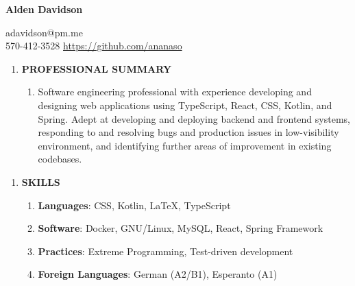 \documentclass[11pt]{article}
\begin{document}
\begin{center}
\begin{minipage}{0.70\textwidth}
	{\Huge\textbf{Alden Davidson}}
\end{minipage}%
\begin{minipage}{0.30\textwidth}
	\raggedleft
	adavidson@pm.me\\
    570-412-3528
    \url{https://github.com/ananaso}
\end{minipage}
\end{center}
\begin{center}
\begin{enumerate}[label={}, leftmargin=0pt, parsep=5pt]
    \item {\Large \textbf{PROFESSIONAL SUMMARY}}
    \begin{enumerate}[label={}, itemsep=5pt]
        \item Software engineering professional with experience developing and designing web applications using TypeScript, React, CSS, Kotlin, and Spring. Adept at developing and deploying backend and frontend systems, responding to and resolving bugs and production issues in low-visibility environment, and identifying further areas of improvement in existing codebases.
    \end{enumerate}
\end{enumerate}
\end{center}
\begin{center}
\begin{enumerate}[label={}, leftmargin=0pt, parsep=5pt]
    \item {\Large \textbf{SKILLS}}
    \begin{enumerate}[label={}, itemsep=5pt]
        \item \textbf{Languages}: CSS, Kotlin, \LaTeX, TypeScript
        \item \textbf{Software}: Docker, GNU/Linux, MySQL, React, Spring Framework
        \item \textbf{Practices}: Extreme Programming, Test-driven development
        \item \textbf{Foreign Languages}: German (A2/B1), Esperanto (A1)
    \end{enumerate}
\end{enumerate}
\end{center}
\end{document}
